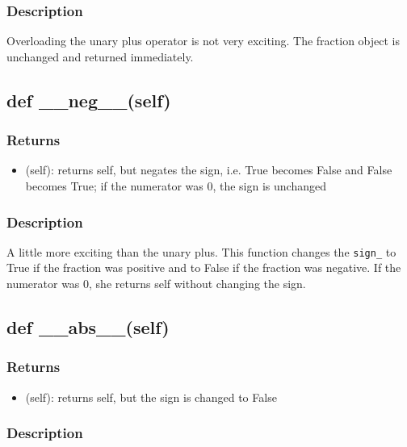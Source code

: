 \documentclass[refman]{scrartcl}
\begin{document}
\subsubsection*{Description}

Overloading the unary plus operator is not very exciting. The fraction object is unchanged and returned immediately.

\subsection{def \_\_neg\_\_(self)}

\subsubsection*{Returns}

\begin{itemize}
	\item (self): returns self, but negates the sign, i.e. True becomes False and False becomes True; if the numerator was 0, the sign is unchanged
  \end{itemize}

\subsubsection*{Description}

A little more exciting than the unary plus. This function changes the \texttt{sign\_} to True if the fraction was positive and to False if the fraction was negative. If the numerator was 0, she returns self without changing the sign.

\subsection{def \_\_abs\_\_(self)}

\subsubsection*{Returns}

\begin{itemize}
	\item (self): returns self, but the sign is changed to False
\end{itemize}

\subsubsection*{Description}
\end{document}

